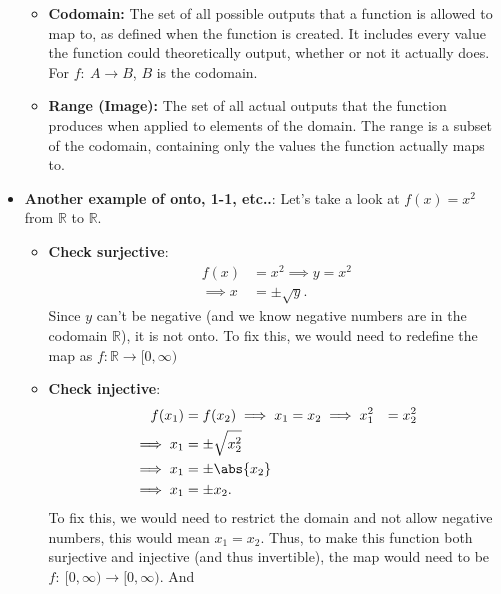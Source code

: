 \documentclass{report}
\begin{document}
\begin{itemize}
                \begin{itemize}
                    \item \textbf{Codomain:} The set of all possible outputs that a function is allowed to map to, as defined when the function is created. It includes every value the function could theoretically output, whether or not it actually does. For $f:\ A\to B$, $B$ is the codomain.
                    \item \textbf{Range (Image):} The set of all actual outputs that the function produces when applied to elements of the domain. The range is a subset of the codomain, containing only the values the function actually maps to.
                \end{itemize}
            \item \textbf{Another example of onto, 1-1, etc..}: Let's take a look at $f(x) = x^{2}$ from $\mathbb{R}$ to $\mathbb{R}$.
                \begin{itemize}
                    \item \textbf{Check surjective}:
                        \begin{align*}
                            f(x) &= x^{2} \implies y =x^{2} \\
                            \implies x &= \pm \sqrt{y} 
                        .\end{align*}
                        Since $y$ can't be negative (and we know negative numbers are in the codomain $\mathbb{R}$), it is not onto. To fix this, we would need to redefine the map as $f: \mathbb{R} \to [0,\infty) $
                    \item \textbf{Check injective}:
                        \begin{align*}
                            f(x_1) &= f(x_2) \implies x_1 = x_2 
                            \implies  x_{1}^{2} &= x_{2}^{2}  \\
                            \implies x_1 & = \pm \sqrt{x_{2}^{2}} \\
                            \implies x_1 &= \pm \abs{x_2} \\
                            \implies x_1 &= \pm x_2
                        .\end{align*}
                        To fix this, we would need to restrict the domain and not allow negative numbers, this would mean $x_1 = x_2$. Thus, to make this function both surjective and injective (and thus invertible), the map would need to be $f:\ [0,\infty) \to [0,\infty)$. And
                        \begin{align*}

\end{align*}
\end{itemize}
\end{itemize}
\end{document}
